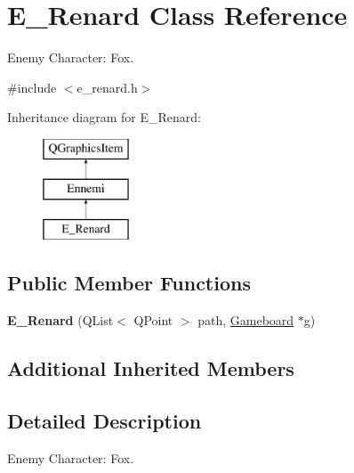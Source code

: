 \hypertarget{class_e___renard}{}\section{E\+\_\+\+Renard Class Reference}
\label{class_e___renard}


Enemy Character\+: Fox.  




{\ttfamily \#include $<$e\+\_\+renard.\+h$>$}

Inheritance diagram for E\+\_\+\+Renard\+:\begin{figure}[H]
\begin{center}
\leavevmode
\includegraphics[height=3.000000cm]{class_e___renard}
\end{center}
\end{figure}
\subsection*{Public Member Functions}
\begin{DoxyCompactItemize}
\item 
\hypertarget{class_e___renard_aa5c7e87d02089ed76c306a3434133645}{}{\bfseries E\+\_\+\+Renard} (Q\+List$<$ Q\+Point $>$ path, \hyperlink{class_gameboard}{Gameboard} $\ast$g)\label{class_e___renard_aa5c7e87d02089ed76c306a3434133645}

\end{DoxyCompactItemize}
\subsection*{Additional Inherited Members}


\subsection{Detailed Description}
Enemy Character\+: Fox. 

